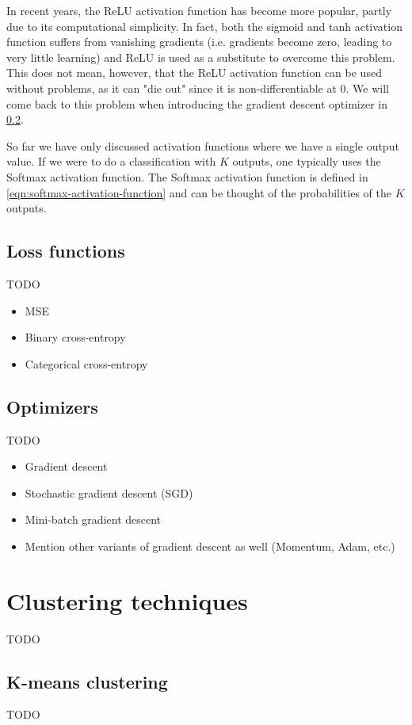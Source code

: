 In recent years, the ReLU activation function has become more popular, partly due to its computational simplicity. In fact, both the sigmoid and tanh activation function suffers from vanishing gradients (i.e. gradients become zero, leading to very little learning) and ReLU is used as a substitute to overcome this problem. This does not mean, however, that the ReLU activation function can be used without problems, as it can "die out" since it is non-differentiable at 0. We will come back to this problem when introducing the gradient descent optimizer in \cref{sec:optimizers-ann}.

So far we have only discussed activation functions where we have a single output value. If we were to do a classification with $K$ outputs, one typically uses the Softmax activation function. The Softmax activation function is defined in \cref{eqn:softmax-activation-function} and can be thought of the probabilities of the $K$ outputs.

\subsection{Loss functions}
\label{sec:loss-functions-ann}
TODO
\begin{itemize}
    \item MSE
    \item Binary cross-entropy
    \item Categorical cross-entropy
\end{itemize}

\subsection{Optimizers}
\label{sec:optimizers-ann}
TODO
\begin{itemize}
    \item Gradient descent
    \item Stochastic gradient descent (SGD)
    \item Mini-batch gradient descent
    \item Mention other variants of gradient descent as well (Momentum, Adam, etc.)
\end{itemize}

\section{Clustering techniques}
TODO

\subsection{K-means clustering}
TODO

